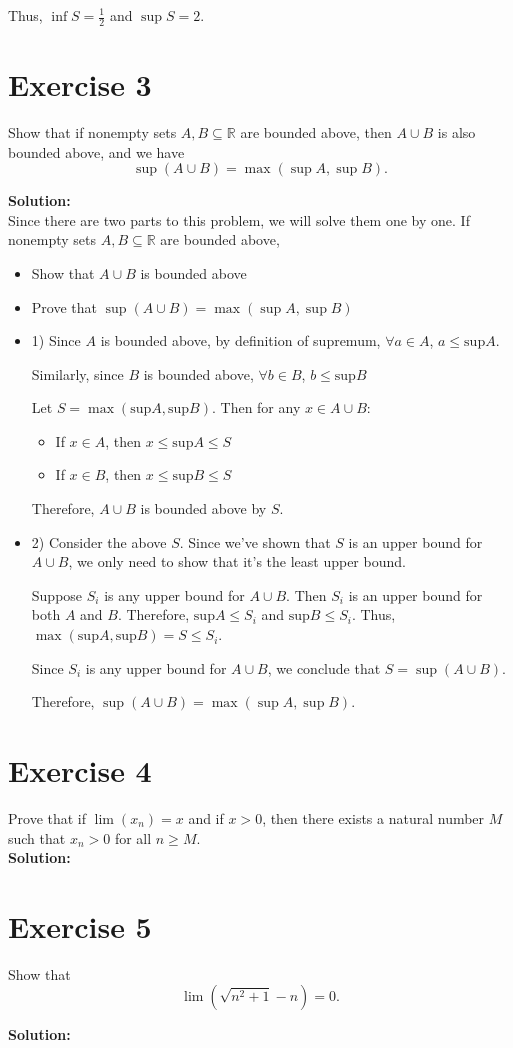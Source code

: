 \documentclass{article}
\begin{document}
Thus, $\inf S = \frac{1}{2}$ and $\sup S = 2$.
\newpage

\section*{Exercise 3}
Show that if nonempty sets $A, B \subseteq \mathbb{R}$ are bounded above, then $A \cup B$ is also bounded above, and we have
\[\sup(A \cup B) = \max(\sup A, \sup B).\]

\textbf{Solution:} \\

Since there are two parts to this problem, we will solve them one by one. If nonempty sets $A, B \subseteq \mathbb{R}$ are bounded above,
\begin{itemize}
    \item Show that $A \cup B$ is bounded above
    \item Prove that $\sup(A \cup B) = \max(\sup A, \sup B)$
\end{itemize}

\begin{itemize}
\item 1) Since $A$ is bounded above, by definition of supremum, $\forall a \in A$, $a \leq \text{sup}A$. 

Similarly, since $B$ is bounded above, $\forall b \in B$, $b \leq \text{sup}B$

Let $S = \max(\text{sup}A, \text{sup}B)$. Then for any $x \in A \cup B$:
\begin{itemize}
    \item If $x \in A$, then $x \leq \text{sup}A \leq S$
    \item If $x \in B$, then $x \leq \text{sup}B \leq S$
\end{itemize}
Therefore, $A \cup B$ is bounded above by $S$.

\item 2) Consider the above $S$. Since we've shown that $S$ is an upper bound for $A \cup B$, we only need to show that it's the least upper bound.

Suppose $S_i$ is any upper bound for $A \cup B$.
Then $S_i$ is an upper bound for both $A$ and $B$.
Therefore, $\text{sup}A \leq S_i$ and $\text{sup}B \leq S_i$.
Thus, $\max(\text{sup}A, \text{sup}B) = S \leq S_i$.

Since $S_i$ is any upper bound for $A \cup B$, we conclude that $S = \sup(A \cup B)$.

Therefore, $\sup(A \cup B) = \max(\sup A, \sup B)$.

\end{itemize}

\newpage

\section*{Exercise 4}
Prove that if $\lim(x_n) = x$ and if $x > 0$, then there exists a natural number $M$ such that $x_n > 0$ for all $n \geq M$. \\

\textbf{Solution:} \\



\newpage

\section*{Exercise 5}
Show that
\[\lim\left(\sqrt{n^2 + 1} - n\right) = 0.\]

\textbf{Solution:} \\
\end{document}
